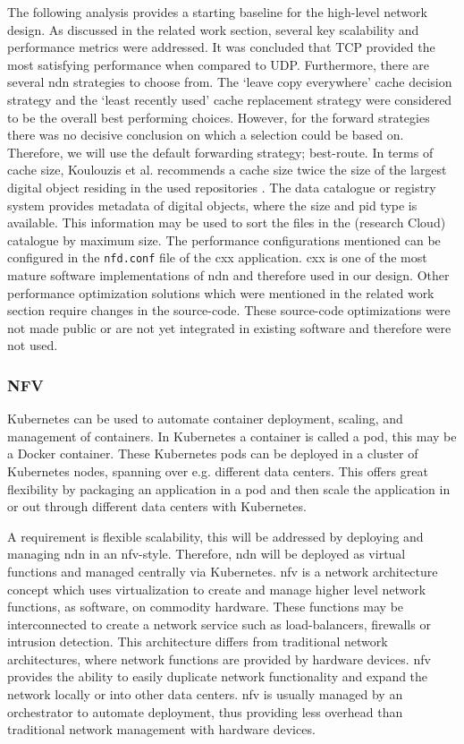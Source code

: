 \documentclass[conference]{IEEEtran}
\begin{document}
The following analysis provides a starting baseline for the high-level network design. As discussed in the related work section, several key scalability and performance metrics were addressed. It was concluded that TCP provided the most satisfying performance when compared to UDP. Furthermore, there are several \gls{ndn} strategies to choose from. The `leave copy everywhere' cache decision strategy and the `least recently used' cache replacement strategy were considered to be the overall best performing choices. However, for the forward strategies there was no decisive conclusion on which a selection could be based on. Therefore, we will use the default forwarding strategy; best-route. In terms of cache size, Koulouzis et al. recommends a cache size twice the size of the largest digital object residing in the used repositories \cite{koulouzis2018information}. The data catalogue or registry system provides metadata of digital objects, where the size and \gls{pid} type is available. This information may be used to sort the files in the (research Cloud) catalogue by maximum size. The performance configurations mentioned can be configured in the \texttt{nfd.conf} file of the \gls{cxx} application. \gls{cxx} is one of the most mature software implementations of \gls{ndn} and therefore used in our design. Other performance optimization solutions which were mentioned in the related work section require changes in the source-code. These source-code optimizations were not made public or are not yet integrated in existing software and therefore were not used.

\subsubsection{NFV}
Kubernetes can be used to automate container deployment, scaling, and management of containers. In Kubernetes a container is called a pod, this may be a Docker container. These Kubernetes pods can be deployed in a cluster of Kubernetes nodes, spanning over e.g. different data centers. This offers great flexibility by packaging an application in a pod and then scale the application in or out through different data centers with Kubernetes.

A requirement is flexible scalability, this will be addressed by deploying and managing \gls{ndn} in an \gls{nfv}-style. Therefore, \gls{ndn} will be deployed as virtual functions and managed centrally via Kubernetes. \gls{nfv} is a network architecture concept which uses virtualization to create and manage higher level network functions, as software, on commodity hardware. These functions may be interconnected to create a network service such as load-balancers, firewalls or intrusion detection. This architecture differs from traditional network architectures, where network functions are provided by hardware devices. \gls{nfv} provides the ability to easily duplicate network functionality and expand the network locally or into other data centers. \gls{nfv} is usually managed by an orchestrator to automate deployment, thus providing less overhead than traditional network management with hardware devices.
\end{document}
